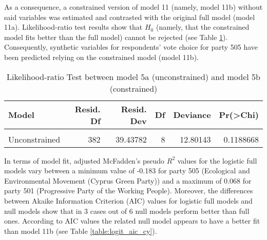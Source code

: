 \documentclass[
]{article}
\begin{document}
As a consequence, a constrained version of model 11 (namely, model 11b) without said variables was
estimated and contrasted with the original full model (model 11a). Likelihood-ratio test results show
that \(H_0\) (namely, that the constrained model fits better than the full model) cannot be rejected
(see Table \ref{table:lrtest_1_cy}). Consequently, synthetic variables for respondents' vote choice for
party 505 have been predicted relying on the constrained model (model 11b).

\begin{table}[!h]

\caption{\label{tab:unnamed-chunk-41}Likelihood-ratio Test between model 5a (unconstrained) and model 5b (constrained)
                  \label{table:lrtest_1_cy}}
\centering
\begin{tabular}[t]{l|r|r|r|r|r}
\hline
Model & Resid. Df & Resid. Dev & Df & Deviance & Pr(>Chi)\\
\hline
\cellcolor{gray!6}{Constrained} & \cellcolor{gray!6}{390} & \cellcolor{gray!6}{52.23925} & \cellcolor{gray!6}{} & \cellcolor{gray!6}{} & \cellcolor{gray!6}{}\\
\hline
Unconstrained & 382 & 39.43782 & 8 & 12.80143 & 0.1188668\\
\hline
\end{tabular}
\end{table}

In terms of model fit, adjusted McFadden's pseudo \(R^2\) values for the logistic full models vary between
a minimum value of
-0.183
for party 505
(Ecological and Environmental Movement (Cyprus Green Party))
and a maximum of
0.068
for party 501
(Progressive Party of the Working People).
Moreover, the differences between Akaike Information Criterion (AIC) values for logistic full models and
null models show that in 3 cases out of 6 null models perform better than full ones. According to AIC
values the related null model appears to have a better fit than model 11b (see Table
\ref{table:logit_aic_cy}).
\end{document}
